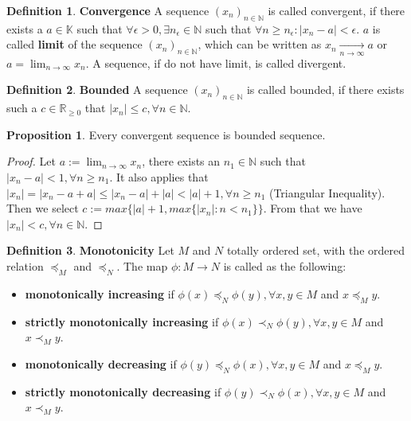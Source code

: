 \documentclass{article}
\theoremstyle{definition}
\newtheorem{defi}{Definition}[subsection]
\newtheorem{prop}{Proposition}[subsection]
\begin{document}
\begin{defi}
\label{definition_of_convergence}
\textbf{Convergence} A sequence $(x_n)_{n\in \mathbb{N}}$ is called convergent, if there exists a $a\in \mathbb{K}$ such that $\forall \epsilon>0, \exists n_{\epsilon}\in \mathbb{N}$ such that $\forall n\geq n_{\epsilon}: |x_{n}-a|<\epsilon$. $a$ is called \textbf{limit} of the sequence $(x_n)_{n\in \mathbb{N}}$, which can be written as $ x_{n}\xrightarrow[{n\to\infty}]{}a$ or $a=\lim_{n\to\infty}x_n$. A sequence, if do not have limit, is called divergent.
\end{defi}

\begin{defi}
\textbf{Bounded} A sequence $(x_n)_{n\in \mathbb{N}}$ is called bounded, if there exists such a $c\in \mathbb{R}_{\geq0}$ that $|x_n|\leq c, \forall n\in \mathbb{N}$.
\end{defi}

\begin{prop}
Every convergent sequence is bounded sequence.
\begin{proof}
Let $a:= \lim_{n\to\infty}x_n$, there exists an $n_1\in \mathbb{N}$ such that $|x_n-a|<1, \forall n \geq n_1$. It also applies that $|x_n|=|x_n-a+a|\leq |x_n-a|+|a|<|a|+1, \forall n\geq n_{1}$ (Triangular Inequality). Then we select $c := max\{|a|+1, max\{|x_n|: n< n_1\}\}$. From that we have $|x_n|<c, \forall n\in \mathbb{N}$.
\end{proof}
\end{prop}

\begin{defi}
\textbf{Monotonicity} Let $M$ and $N$ totally ordered set, with the ordered relation $\preceq_{M}$ and $\preceq_{N}$. The map $\phi: M \to N$ is called as the following:
\begin{itemize}
    \item \textbf{monotonically increasing} if $\phi(x)\preceq_{N}\phi(y), \forall x,y \in M$ and $x\preceq_{M}y$.
    \item \textbf{strictly monotonically increasing} if $\phi(x)\prec_{N}\phi(y), \forall x,y \in M$ and $x\prec_{M}y$.
    \item \textbf{monotonically decreasing} if $\phi(y)\preceq_{N}\phi(x), \forall x,y \in M$ and $x\preceq_{M}y$.
    \item \textbf{strictly monotonically decreasing} if $\phi(y)\prec_{N}\phi(x), \forall x,y \in M$ and $x\prec_{M}y$.
\end{itemize}
\end{defi}
\end{document}
